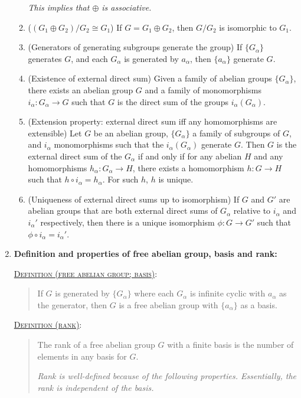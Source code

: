 \documentclass[letterpaper, 12pt]{book}
\newcommand{\defn}[2]{\textsc{\underline{Definition (#1)}:}\begin{quote} #2\end{quote}}
\begin{document}
\begin{enumerate}[resume]
\begin{enumerate}
            \textit{This implies that $\oplus$ is associative.}
            \item ($(G_1\oplus G_2)/G_2 \cong G_1$) If $G = G_1\oplus G_2$, then $G/G_2$ is isomorphic to $G_1$.
            \item (Generators of generating subgroups generate the group) If $\{G_\alpha\}$ generates $G$, and each $G_\alpha$ is generated by $a_\alpha$, then $\{a_\alpha\}$ generate $G$.
            \item (Existence of external direct sum) Given a family of abelian groups $\{G_\alpha\}$, there exists an abelian group $G$ and a family of monomorphisms $i_\alpha : G_\alpha \to G$ such that $G$ is the direct sum of the groups $i_\alpha(G_\alpha)$.
            \item (Extension property: external direct sum iff any homomorphisms are extensible) Let $G$ be an abelian group, $\{G_\alpha\}$ a family of subgroups of $G$, and $i_\alpha$ monomorphisms such that the $i_\alpha(G_\alpha)$ generate $G$. Then $G$ is the external direct sum of the $G_\alpha$ if and only if for any abelian $H$ and any homomorphisms $h_\alpha : G_\alpha \to H$, there exists a homomorphism $h: G\to H$ such that $h\circ i_\alpha = h_\alpha$. For such $h$, $h$ is unique.
            \item (Uniqueness of external direct sums up to isomorphism) If $G$ and $G'$ are abelian groups that are both external direct sums of $G_\alpha$ relative to $i_\alpha$ and $i_\alpha'$ respectively, then there is a unique isomorphism $\phi : G\to G'$ such that $\phi\circ i_\alpha = i_\alpha'$.
            \end{enumerate}
    \item \textbf{Definition and properties of free abelian group, basis and rank:}
        
        \defn{free abelian group; basis}{If $G$ is generated by $\{G_\alpha\}$ where each $G_\alpha$ is infinite cyclic with $a_\alpha$ as the generator, then $G$ is a free abelian group with $\{a_\alpha\}$ as a basis.}

        \defn{rank}{The rank of a free abelian group $G$ with a finite basis is the number of elements in any basis for $G$.

        \textit{Rank is well-defined because of the following properties. Essentially, the rank is independent of the basis.}}


\end{enumerate}
\end{document}
